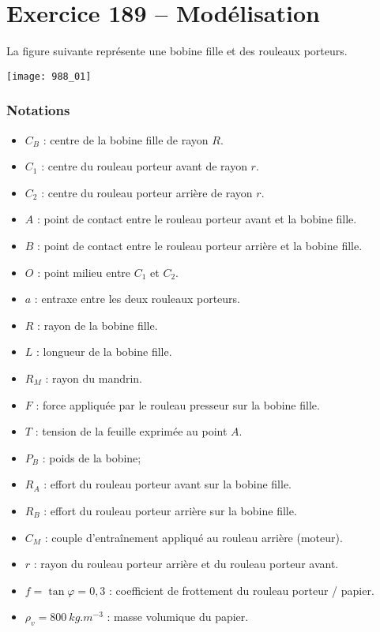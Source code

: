 \section*{Exercice 189 -- Modélisation}
\setcounter{exo}{0}


La figure suivante représente une bobine fille et des rouleaux porteurs.


\begin{center}
\texttt{[image: 988\_01]}%
\end{center}

\subsubsection*{Notations}
\begin{itemize}
\item $C_B$ : centre de la bobine fille de rayon $R$.
\item $C_1$ : centre du rouleau porteur avant de rayon $r$.
\item $C_2$ : centre du rouleau porteur arrière de rayon $r$.
\item $A$ : point de contact entre le rouleau porteur avant et la bobine fille.
\item $B$ : point de contact entre le rouleau porteur arrière et la bobine fille.
\item $O$ : point milieu entre $C_1$ et $C_2$.
\item $a$ : entraxe entre les deux rouleaux porteurs.
\item $R$ : rayon de la bobine fille.
\item $L$ : longueur de la bobine fille.
\item $R_M$ : rayon du mandrin.
\item $F$ : force appliquée par le rouleau presseur sur la bobine fille. 
\item $T$ : tension de la feuille exprimée au point $A$.
\item $P_B$ : poids de la bobine;
\item $R_A$ : effort du rouleau porteur avant sur la bobine fille.  
\item $R_B$ : effort du rouleau porteur arrière sur la bobine fille.
\item $C_M$ : couple d’entraînement appliqué au rouleau arrière (moteur).
\item $r$ : rayon du rouleau porteur arrière et du rouleau porteur avant. 
\item $f=\tan\varphi = 0,3$ : coefficient de frottement du rouleau porteur / papier.  
\item $\rho_v = \SI{800}{kg.m^{-3}}$ : masse volumique du papier.
\end{itemize}

